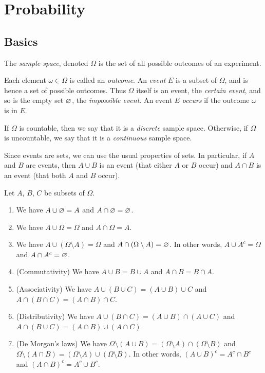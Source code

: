 \chapter{Probability}

\section{Basics}

\begin{definition}
  The \emph{sample space}, denoted $\Omega$ is the set of all possible outcomes of an experiment.

  Each element $\omega \in \Omega$ is called an \emph{outcome}. An \emph{event} $E$ is a subset of $\Omega$, and is hence a set of possible outcomes. Thus $\Omega$ itself is an event, the \emph{certain event}, and so is the empty set $\varnothing$, the \emph{impossible event}. An event $E$ \emph{occurs} if the outcome $\omega$ is in $E$.
\end{definition}

\begin{definition}
  If $\Omega$ is countable, then we say that it is a \emph{discrete} sample space. Otherwise, if $\Omega$ is uncountable, we say that it is a \emph{continuous} sample space.
\end{definition}

Since events are sets, we can use the usual properties of sets. In particular, if $A$ and $B$ are events, then $A \cup B$ is an event (that either $A$ or $B$ occur) and $A \cap B$ is an event (that both $A$ and $B$ occur).

\begin{proposition}
  Let $A$, $B$, $C$ be subsets of $\Omega$.
  \begin{enumerate}
\item We have $A \cup \varnothing = A$ and $A \cap \varnothing = \varnothing$.
    \item We have $A \cup \Omega = \Omega$ and $A \cap \Omega = A$. 
    \item We have $A \cup (\Omega \setminus A) = \Omega$ and $A \cap (\Omega \setminus A) = \varnothing$. In other words, $A \cup A^{c} =\Omega$ and $A \cap A^{c} = \varnothing$.
    \item (Commutativity) We have $A \cup B = B \cup A$  and $A \cap B = B \cap A$.
    \item (Associativity) We have $A \cup (B \cup C) = (A \cup B) \cup C$ and $A \cap (B \cap C) = (A \cap B) \cap C$.
    \item (Distributivity) We have $A \cup (B \cap C) = (A \cup B) \cap (A \cup C)$ and $A \cap (B \cup C) = (A \cap B) \cup (A \cap C)$.
    \item (De Morgan's laws) We have $\Omega \setminus (A \cup B) = (\Omega \setminus A) \cap (\Omega \setminus B)$ and $\Omega \setminus (A \cap B) = (\Omega \setminus A) \cup (\Omega \setminus B)$. In other words, $(A \cup B)^{c} = A^{c} \cap B^{c}$ and $(A \cap B)^{c} = A^{c} \cup B^{c}$.
  \end{enumerate}
\end{proposition}

